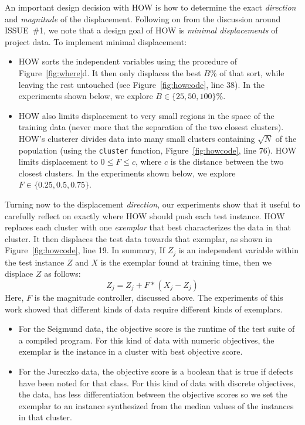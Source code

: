 \documentclass[conference]{IEEEtran}
\newcommand{\bi}{\begin{itemize}}
\newcommand{\ei}{\end{itemize}}
\newcommand{\fig}[1]{Figure~\ref{fig:#1}}
\begin{document}
An important design decision with HOW 
is how to determine the exact {\em direction} and {\em magnitude} of the
displacement.  Following on from the discussion around   ISSUE~\#1,
we note that a design goal of HOW is
{\em minimal displacements} of project data.
To implement minimal displacement:
\bi
\item
HOW sorts  the independent variables
using the procedure of  \fig{where}d. It then only
displaces the    best $B$\%  of that sort, while leaving the rest untouched
(see \fig{howcode}, line 38).
In  the experiments shown below,  we explore   $B \in \{25,50,100\}\%$.
\item
HOW also  limits displacement
to very small regions in the space of the training data (never more that the separation
of the two closest clusters).  HOW's clusterer divides  data into many   small clusters containing
$\sqrt{N}$ of the population (using the {\tt cluster} function, \fig{howcode}, line 76).
HOW   limits displacement to  \mbox{$0 \le F \le c$}, where
$c$ is the distance between the two closest clusters. 
In  the experiments shown below,  we explore
\mbox{$F\in \{0.25, 0.5, 0.75\}$}.
\ei
Turning now to the displacement {\em direction},
our experiments show that it useful to  carefully reflect on exactly where HOW should  push each test instance.
HOW replaces each cluster   with one {\em exemplar} that best
characterizes the data in that cluster. It then displaces the
test data towards that exemplar, as shown in \fig{howcode}, line 19. In summary, 
If  $Z_j$ is an independent variable within the
test instance $Z$ and  $X$ is the exemplar found at training time,
then we displace $Z$ as follows:
\[Z_j =  Z_j + F*(X_j - Z_j)\]
Here, $F$ is the  magnitude controller, discussed above.
The experiments of this work showed that different kinds of data require
different kinds of exemplars.
\bi
\item
For the Seigmund data,
the objective score is the runtime of the test suite of a compiled program.
For this kind of data with numeric objectives,
the exemplar  is the instance in a cluster
with  best objective score.
\item
For the Jureczko data, the objective score
is a boolean that is true if defects have been noted
for that class. 
For this kind of data with discrete objectives,
the data, 
has less differentiation between the objective scores
so we set the exemplar to  
an instance synthesized from the median values of the instances
in that cluster.
\ei 

  
  
\end{document}

